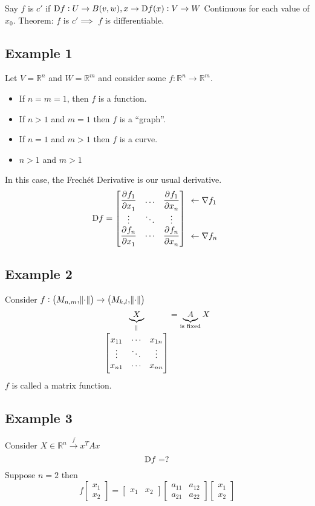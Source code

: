\documentclass{article}
\newcommand{\m}[1]{\begin{bmatrix} #1 \end{bmatrix}}
\newcommand{\RR}{\mathbb{R}}
\begin{document}
Say \(f\) is \(c'\) if  \(\Dif f : U \to B(v, w), x \to \Dif f(x) : V \to W\)
Continuous for each value of \(x_0\).
Theorem: \(f\) is \(c'\implies\) \(f\) is differentiable.

\subsection{Example 1}

Let \(V = \RR^n\) and \(W = \RR^m\) and consider some \(f: \RR^n \to \RR^m\).
\begin{itemize}
\item If \(n = m = 1\), then \(f\) is a function.
\item If \(n >1\) and \(m = 1\) then \(f\) is a ``graph''.
\item If \(n = 1\) and \(m > 1\) then \(f\) is a curve.
\item \(n > 1\) and \(m> 1\)
\end{itemize}

In this case, the Frech\'et Derivative is our usual derivative.
\[\Dif f = \m{\dpd{f_1}{x_1} & \dots& \dpd{f_1}{x_n}\\\vdots & \ddots & \vdots\\ \dpd{f_n}{x_1}& \cdots & \dpd{f_n}{x_n}}
  \begin{array}{l}
    \leftarrow \nabla f_1\\[3em]
    \leftarrow \nabla f_n
  \end{array}
\]

\subsection{Example 2}

Consider \(f: \del{M_{n, m}, \norm{\cdot}} \to \del{M_{k, l}, \norm{\cdot}}\)
\[\underbrace{X}_{\stackrel{\rotatebox{90}{=}}{\m{x_{11} & \cdots & x_{1n}\\\vdots & \ddots&\vdots\\x_{n1} & \cdots & x_{nn}}}} = \underbrace{A}_{\text{is fixed}}X\]
\(f\) is called a matrix function.

\subsection{Example 3}

Consider \(X \in \RR^n \stackrel{f}{\to} x^TAx\)
\[\Dif f = ?\]
Suppose \(n = 2\) then
\[f\m{x_1\\x_2} = \m{x_1 & x_2}\m{a_{11} & a_{12}\\ a_{21} & a_{22}}\m{x_1\\ x_2}\]
\end{document}
